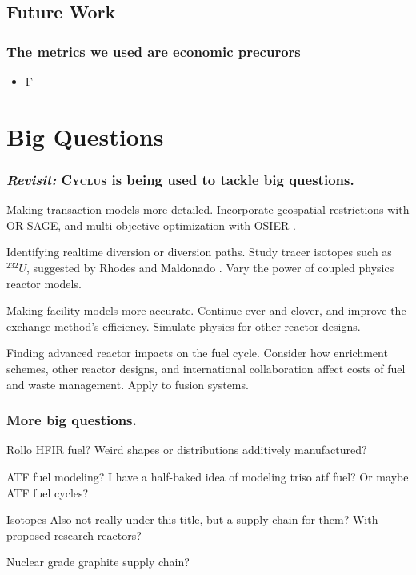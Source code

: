 \documentclass[9pt]{beamer}
\newcommand{\cyclus}{\textsc{Cyclus}\xspace}
\begin{document}
  \subsection{Future Work}
  \begin{frame}
      \frametitle{The metrics we used are economic precurors}
      \begin{itemize}
          \item F
      \end{itemize}
  \end{frame}

  \section{Big Questions}
  \begin{frame}
    \frametitle{\textit{Revisit:} \cyclus is being used to tackle big questions.}
    \begin{block}{Making transaction models more detailed.}
        Incorporate geospatial restrictions with OR-SAGE, and multi objective optimization with OSIER \cite{Dotson_osier}.
    \end{block}
    \begin{block}{Identifying realtime diversion or diversion paths.}
        Study tracer isotopes such as $^{232}U$, suggested by Rhodes and Maldonado \cite{rhodes_u232}. Vary the power of coupled physics reactor models.
    \end{block}
    \begin{block}{Making facility models more accurate.}
      Continue \gls{ever} and \gls{clover}, and improve the exchange method's efficiency. Simulate physics for other reactor designs.
    \end{block}
    \begin{block}{Finding advanced reactor impacts on the fuel cycle.}
      Consider how enrichment schemes, other reactor designs, and international collaboration affect costs of fuel and waste management. Apply to fusion systems.
    \end{block}
  \end{frame}

  \begin{frame}
    \frametitle{More big questions.} %
    \begin{block}{Rollo}
      HFIR fuel? Weird shapes or distributions additively manufactured?
    \end{block}
    \begin{block}{ATF fuel modeling?}
      I have a half-baked idea of modeling triso atf fuel? Or maybe ATF fuel cycles?
    \end{block}
    \begin{block}{Isotopes}
      Also not really under this title, but a supply chain for them? With proposed research reactors?
    \end{block}
    \begin{block}{Nuclear grade graphite}
      supply chain?
    \end{block}
  \end{frame}
\end{document}
